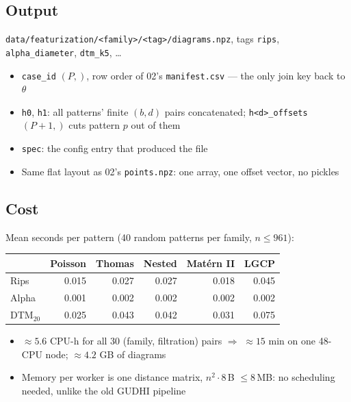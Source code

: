 \documentclass[11pt]{article}
\begin{document}
\subsection*{Output}
\texttt{data/featurization/<family>/<tag>/diagrams.npz}, tags \texttt{rips}, \texttt{alpha\_diameter}, \texttt{dtm\_k5}, \dots
\begin{itemize}
  \item \texttt{case\_id} $(P,)$, row order of 02's \texttt{manifest.csv} --- the only join key back to $\theta$
  \item \texttt{h0}, \texttt{h1}: all patterns' finite $(b,d)$ pairs concatenated; \texttt{h<d>\_offsets} $(P+1,)$ cuts pattern $p$ out of them
  \item \texttt{spec}: the config entry that produced the file
  \item Same flat layout as 02's \texttt{points.npz}: one array, one offset vector, no pickles
\end{itemize}

\subsection*{Cost}
Mean seconds per pattern (40 random patterns per family, $n\le961$):

\smallskip
\begin{tabular}{@{}lrrrrr@{}}
\toprule
 & Poisson & Thomas & Nested & Mat\'ern II & LGCP \\
\midrule
Rips     & 0.015 & 0.027 & 0.027 & 0.018 & 0.045 \\
Alpha    & 0.001 & 0.002 & 0.002 & 0.002 & 0.002 \\
DTM$_{20}$ & 0.025 & 0.043 & 0.042 & 0.031 & 0.075 \\
\bottomrule
\end{tabular}
\begin{itemize}
  \item $\approx5.6$ CPU-h for all 30 (family, filtration) pairs $\Rightarrow$ $\approx15$ min on one 48-CPU node; $\approx4.2$ GB of diagrams
  \item Memory per worker is one distance matrix, $n^2\cdot8$\,B $\le8$\,MB: no scheduling needed, unlike the old GUDHI pipeline
\end{itemize}
\end{document}
